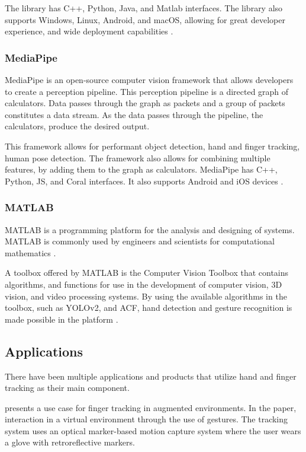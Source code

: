 \documentclass{report}
\begin{document}
The library has C++, Python, Java, and Matlab interfaces. The library also supports
Windows, Linux, Android, and macOS, allowing for great developer experience, and
wide deployment capabilities \parencite{opencv}.

\subsubsection{MediaPipe}
\label{section:rrl-mediapipe}

MediaPipe is an open-source computer vision framework that allows developers to
create a perception pipeline. This perception pipeline is a directed graph of
calculators. Data passes through the graph as packets and a group of packets
constitutes a data stream. As the data passes through the pipeline, the
calculators, produce the desired output.

This framework allows for performant object detection, hand and finger tracking,
human pose detection. The framework also allows for combining multiple features,
by adding them to the graph as calculators. MediaPipe has C++, Python, JS, and
Coral interfaces. It also supports Android and iOS devices
\parencite{mediapipe}.

\subsubsection{MATLAB}
MATLAB is a programming platform for the analysis and designing of systems.
MATLAB is commonly used by engineers and scientists for computational
mathematics \parencite{what-matlab}.

A toolbox offered by MATLAB is the Computer Vision Toolbox that contains
algorithms, and functions for use in the development of computer vision, 3D
vision, and video processing systems. By using the available algorithms in the
toolbox, such as YOLOv2, and ACF, hand detection and gesture recognition is made
possible in the platform \parencite{matlab}.

\subsection{Applications}

There have been multiple applications and products that utilize hand and finger
tracking as their main component.

\cite{dorf2001} presents a use case for finger tracking in augmented
environments. In the paper, interaction in a virtual environment through the use
of gestures. The tracking system uses an optical marker-based motion capture
system where the user wears a glove with retroreflective markers.
\end{document}
